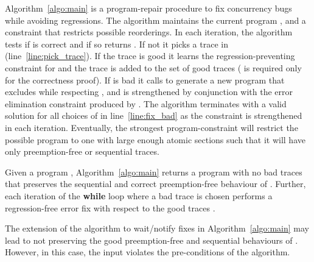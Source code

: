 \documentclass{llncs}
\newcommand\remove[1]{}
\begin{document}
Algorithm~\ref{algo:main} is a program-repair procedure to fix
concurrency bugs while avoiding regressions.
The algorithm maintains the current program ,
and a constraint  that restricts possible reorderings.
In each iteration, the algorithm tests if  is correct and if so
returns .
If not it picks a trace  in 
(line~\ref{line:pick_trace}).
If the trace is good it learns the regression-preventing constraint
 for  and the trace  is added to the set of
good traces  ( is required only for the correctness proof).
If  is bad it calls  to generate a new program that
excludes  while respecting , and  is
strengthened by conjunction with the error elimination constraint
 produced by .
The algorithm terminates with a valid solution for all choices
of  in line~\ref{line:fix_bad} as the constraint  is
strengthened in each  iteration. 
Eventually, the strongest program-constraint will restrict the possible
program  to one with large enough atomic sections such that it
will have only preemption-free or sequential traces.


\begin{theorem}[Soundness]
  \label{lem:algo_soundness}
  Given a program , Algorithm~\ref{algo:main} returns a program
   with no bad traces that preserves the sequential and correct
  preemption-free behaviour of .
  Further, each iteration of the {\bf while} loop where a bad trace
   is chosen performs a regression-free error fix with respect
  to the good traces .
\end{theorem}
\remove{
\begin{proof}[outline]
  We need to show there are no bad traces in  and all sequential traces remain.
  The first follows because the algorithm only terminates if  is correct and
  the second follows because we do not insert wait-notify statements. Additionally we need to show that 
  if all preemption-free traces are good they are preserved. This is guaranteed by 
  as it does not do transformations across preemption-points if the trace is not preemption-free.
  
  We further need to show that no regression is introduced in each iteration and that the
  bad trace disappears. These follow directly from the properties of .
\end{proof}
}
The extension of the  algorithm to wait/notify
fixes in Algorithm~\ref{algo:main} may lead to  not preserving
the good preemption-free and sequential behaviours of .
However, in this case, the input  violates the pre-conditions 
of the algorithm.
\end{document}
